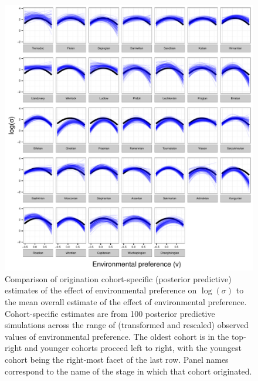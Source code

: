 \documentclass{article}
\begin{document}
\begin{figure}[ht]
  \centering
  \includegraphics[width = \textwidth,height = 0.8\textheight,keepaspectratio=true]{figure/env_cohort}
  \caption{Comparison of origination cohort-specific (posterior predictive) estimates of the effect of environmental preference on \(\log(\sigma)\) to the mean overall estimate of the effect of environmental preference. Cohort-specific estimates are from 100 posterior predictive simulations across the range of (transformed and rescaled) observed values of environmental preference. The oldest cohort is in the top-right and younger cohorts proceed left to right, with the youngest cohort being the right-most facet of the last row. Panel names correspond to the name of the stage in which that cohort originated.}
  \label{fig:env_cohort}
\end{figure}
\end{document}
